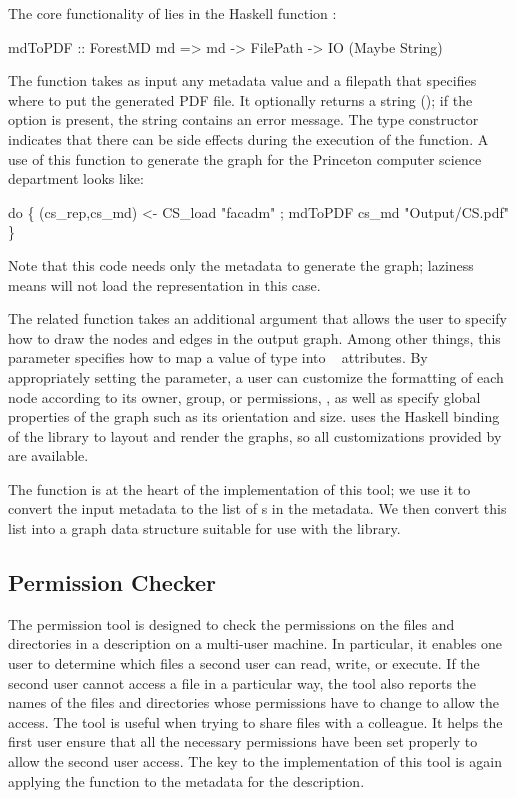 The core functionality of \fg{} lies in the Haskell function :
\begin{code}
mdToPDF :: ForestMD md => 
     md -> FilePath -> IO (Maybe String)
\end{code}
The function takes as input any metadata value and a
filepath that specifies where to 
put the generated PDF file.  It optionally returns a string (); if the option is present, the string contains an error
message.  The  type constructor indicates that there can be
side effects during the execution of the function.  A use of
this function to generate the graph for the Princeton computer science
department \filestore{} looks like:
\begin{code}
 do \{ (cs_rep,cs_md) <- CS_load  "facadm"
    ; mdToPDF cs_md "Output/CS.pdf"       \}
\end{code}
Note that this code needs only the metadata to generate the graph;
laziness means \forest{} will not load the representation in this
case. 

The related function  takes an additional
argument that allows the user to specify how to draw the nodes and
edges in the output graph.  Among other things, this parameter
specifies how to map a value of type  into
\graphviz{}~\cite{haskell-graphviz,Gansner+:graphviz} attributes.  By appropriately setting the
parameter, a user can customize the formatting of each node according
to its owner, group, or permissions, \etc{}, as well as specify global
properties of the graph such as its orientation and size.  \fg{} uses
the Haskell binding of the \graphviz{} library to layout and render
the graphs, so all customizations provided by \graphviz{} are
available.

The  function is at the heart of the implementation of
this tool; we use it to convert the input metadata to the list of
s in the metadata.  We then convert this list into a
graph data structure suitable for use with the \graphviz{} library.

\subsection{Permission Checker}
The permission tool is designed to check the permissions on the files
and directories in a \forest{} description on a multi-user machine.
In particular, it enables one user to determine which files a second
user can read, write, or execute.  If the second user cannot access a
file in a particular way, the tool also reports the names of the files
and directories whose permissions have to change to allow the access.
The tool is useful when trying to share files with a colleague.  It
helps the first user ensure that all the necessary permissions
have been set properly to allow the second user access.  The key to
the implementation of this tool is again applying the 
function to the metadata for the \forest{} description.

